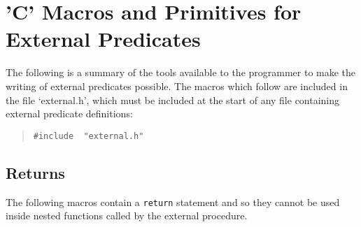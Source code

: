 %
% 
% 
% 
% 

%

%
%
%
\chapter{'C' Macros and Primitives for External Predicates}
\label{chapcmacros}

The following is a summary of the tools available to the \eclipse
programmer to make the writing of external predicates possible.  
The macros which follow are included in the file `external.h', which
must be included at the start of any file containing external predicate
definitions:
\begin{quote}
\begin{verbatim}
#include  "external.h"
\end{verbatim}
\end{quote}

\section{Returns}
The following macros contain a {\tt return} statement and so they
cannot be used inside nested functions called by the external procedure.

